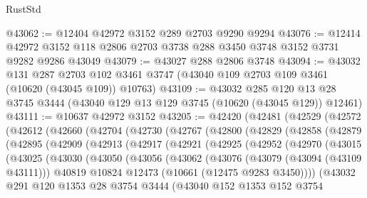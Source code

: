 \begin{lexlean}{RustStd}
\begin{coremodule}
@43062 := @12404 @42972 @3152 @289 @2703 @9290 @9294
@43076 := @12414 @42972 @3152 @118 @2806 @2703 @3738 @288 @3450 @3748 @3152 @3731 @9282 @9286 @43049
@43079 := @43027 @288 @2806 @3748
@43094 := @43032
    @131
    @287
    @2703
    @102
    @3461
    @3747
    (@43040 @109 @2703 @109 @3461 (@10620 (@43045 @109)) @10763)
@43109 := @43032
    @285
    @120
    @13
    @28
    @3745
    @3444
    (@43040 @129 @13 @129 @3745 (@10620 (@43045 @129)) @12461)
@43111 := @10637 @42972 @3152
@43205 := @42420
    (@42481
      (@42529
        (@42572
          (@42612
            (@42660
              (@42704
                (@42730
                  (@42767
                    (@42800
                      (@42829
                        (@42858
                          (@42879
                            (@42895
                              (@42909
                                (@42913
                                  (@42917
                                    (@42921
                                      (@42925
                                        (@42952
                                          (@42970
                                            (@43015
                                              (@43025
                                                (@43030
                                                  (@43050
                                                    (@43056
                                                      (@43062
                                                        (@43076
                                                          (@43079 (@43094 (@43109 @43111)))
                                                          @40819
                                                          @10824
                                                          @12473
                                                          (@10661 (@12475 @9283 @3450))))
                                                      (@43032
                                                        @291
                                                        @120
                                                        @1353
                                                        @28
                                                        @3754
                                                        @3444
                                                        (@43040
                                                          @152
                                                          @1353
                                                          @152
                                                          @3754

\end{coremodule}
\end{lexlean}
